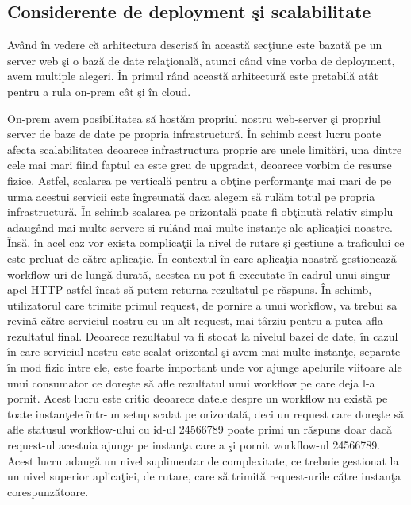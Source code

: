 \subsection{Considerente de deployment şi scalabilitate}
\quad Având în vedere că arhitectura descrisă în această secţiune este bazată pe un server web şi o bază de date relaţională, atunci când vine vorba de deployment, avem multiple alegeri. În primul rând această arhitectură este pretabilă atât pentru a rula on-prem cât şi în cloud. 
\par On-prem avem posibilitatea să hostăm propriul nostru web-server şi propriul server de baze de date pe propria infrastructură. În schimb acest lucru poate afecta scalabilitatea deoarece infrastructura proprie are unele limitări, una dintre cele mai mari fiind faptul ca este greu de upgradat, deoarece vorbim de resurse fizice. Astfel, scalarea pe verticală pentru a obţine performanţe mai mari de pe urma acestui servicii este îngreunată daca alegem să rulăm totul pe propria infrastructură. În schimb scalarea pe orizontală poate fi obţinută relativ simplu adaugând mai multe servere si rulând mai multe instanţe ale aplicaţiei noastre. Însă, în acel caz vor exista complicaţii la nivel de rutare şi gestiune a traficului ce este preluat de către aplicaţie. În contextul în care aplicaţia noastră gestionează workflow-uri de lungă durată, acestea nu pot fi executate în cadrul unui singur apel HTTP astfel încat să putem returna rezultatul pe răspuns. În schimb, utilizatorul care trimite primul request, de pornire a unui workflow, va trebui sa revină către serviciul nostru cu un alt request, mai târziu pentru a putea afla rezultatul final. Deoarece rezultatul va fi stocat la nivelul bazei de date, în cazul în care serviciul nostru este scalat orizontal şi avem mai multe instanţe, separate în mod fizic intre ele, este foarte important unde vor ajunge apelurile viitoare ale unui consumator ce doreşte să afle rezultatul unui workflow pe care deja l-a pornit. Acest lucru este critic deoarece datele despre un workflow nu există pe toate instanţele într-un setup scalat pe orizontală, deci un request care doreşte să afle statusul workflow-ului cu id-ul 24566789 poate primi un răspuns doar dacă request-ul acestuia ajunge pe instanţa care a şi pornit workflow-ul 24566789. Acest lucru adaugă un nivel suplimentar de complexitate, ce trebuie gestionat la un nivel superior aplicaţiei, de rutare, care să trimită request-urile către instanţa corespunzătoare.
